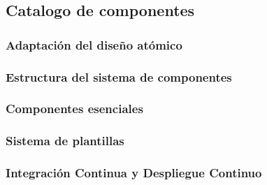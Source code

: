 \subsection{Catalogo de componentes}
\subsubsection{Adaptación del diseño atómico}
\subsubsection{Estructura del sistema de componentes}
\subsubsection{Componentes esenciales}
\subsubsection{Sistema de plantillas}
\subsubsection{Integración Continua y Despliegue Continuo}
